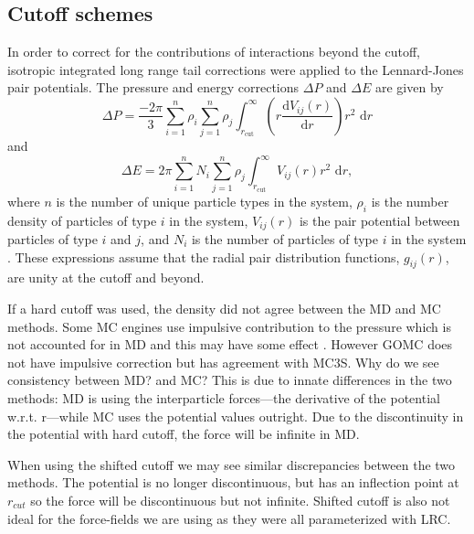 \subsection{Cutoff schemes}\label{sec:cutoff}

In order to correct for the contributions of interactions beyond the cutoff, isotropic integrated long range tail corrections were applied to the Lennard-Jones pair potentials. 
The pressure and energy corrections $\Delta P$ and $\Delta E$ are given by
\begin{equation}\label{lrc_p}
    \Delta P = \frac{-2\pi}{3} \sum_{i=1}^{n} \rho_i \sum_{j=1}^{n} \rho_j
    \int_{r_\mathrm{cut}}^{\infty} \left( r
    \frac{\mathrm{d}V_{ij}(r)}{\mathrm{d}r} \right) r^2 \,\,\mathrm{d}r  
\end{equation}
and
\begin{equation}\label{lrc_e}
    \Delta E = 2\pi \sum_{i=1}^{n} N_i \sum_{j=1}^{n} \rho_j
    \int_{r_\mathrm{cut}}^{\infty} V_{ij}(r) r^2\,\,\mathrm{d}r, 
\end{equation}
where $n$ is the number of unique particle types in the system, $\rho_{i}$ is the number density of particles of type $i$ in the system, $V_{ij}(r)$ is the pair potential between particles of type $i$ and $j$, and $N_{i}$ is the number of particles of type $i$ in the system \citep{frenkel2001understanding, Sun1998}.
These expressions assume that the radial pair distribution functions, $g_{ij}(r)$, are unity at the cutoff and beyond. 

If a hard cutoff was used, the density did not agree between the MD and MC methods.
Some MC engines use impulsive contribution to the pressure which is not accounted for in MD and this may have some effect \citep{frenkel2001understanding}.
However GOMC does not have impulsive correction but has agreement with MC3S. Why do we see consistency between MD? and MC?
This is due to innate differences in the two methods: MD is using the interparticle forces---the derivative of the potential w.r.t. r---while MC uses the potential values outright.
Due to the discontinuity in the potential with hard cutoff, the force will be infinite in MD.

When using the shifted cutoff we may see similar discrepancies between the two methods. 
The potential is no longer discontinuous, but has an inflection point at $r_{cut}$ so the force will be discontinuous but not infinite.
Shifted cutoff is also not ideal for the force-fields we are using as they were all parameterized with LRC. 

